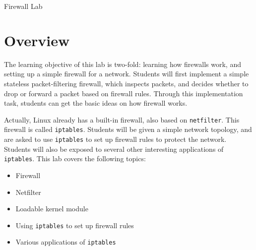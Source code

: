 
\newcommand{\commonfolder}{../../common-files}




\newcommand{\telnet} {\texttt{telnet}\xspace}
\newcommand{\iptables}{\texttt{iptables}\xspace}
\newcommand{\netfilter}{\texttt{netfilter}\xspace}
\newcommand{\Netfilter}{\texttt{Netfilter}\xspace}

\newcommand{\firewallFigs}{./Figs}





\begin{center}
{\LARGE Firewall Lab}
\end{center}




\section{Overview}

The learning objective of this lab is two-fold: learning
how firewalls work, and setting up a simple firewall
for a network. Students will first 
implement a simple stateless packet-filtering firewall, 
which inspects packets, and decides 
whether to drop or forward a packet based on firewall rules. 
Through this implementation task, students can get the 
basic ideas on how firewall works.


Actually, Linux already has a built-in firewall, also based on 
\texttt{netfilter}. This firewall is called \iptables. 
Students will be given a simple network topology, and are asked to
use \iptables to set up firewall rules to protect the network. 
Students will also be exposed to several other interesting 
applications of \iptables. 
This lab covers the following topics:


\begin{itemize}[noitemsep]
\item Firewall
\item Netfilter
\item Loadable kernel module
\item Using \iptables to set up firewall rules
\item Various applications of \iptables
\end{itemize}


